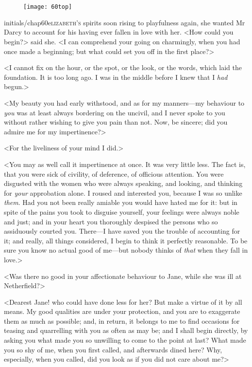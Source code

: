 \chapter[Chapter \thechapter]{}
	
\begin{figure}[t!]
\centering
\texttt{[image: 60top]}
\end{figure}


\lettrine[lines=6,image=true]{initials/chap60e}{lizabeth's} spirits soon rising to playfulness again, she wanted Mr Darcy to account for his having ever fallen in love with her. <How could you begin?> said she. <I can comprehend your going on charmingly, when you had once made a beginning; but what could set you off in the first place?>

\zz
<I cannot fix on the hour, or the spot, or the look, or the words, which laid the foundation. It is too long ago. I was in the middle before I knew that I \textit{had} begun.>

<My beauty you had early withstood, and as for my manners—my behaviour to \textit{you} was at least always bordering on the uncivil, and I never spoke to you without rather wishing to give you pain than not. Now, be sincere; did you admire me for my impertinence?>

<For the liveliness of your mind I did.>

<You may as well call it impertinence at once. It was very little less. The fact is, that you were sick of civility, of deference, of officious attention. You were disgusted with the women who were always speaking, and looking, and thinking for \textit{your} approbation alone. I roused and interested you, because I was so unlike \textit{them}. Had you not been really amiable you would have hated me for it: but in spite of the pains you took to disguise yourself, your feelings were always noble and just; and in your heart you thoroughly despised the persons who so assiduously courted you. There—I have saved you the trouble of accounting for it; and really, all things considered, I begin to think it perfectly reasonable. To be sure you know no actual good of me—but nobody thinks of \textit{that} when they fall in love.>

<Was there no good in your affectionate behaviour to Jane, while she was ill at Netherfield?>

<Dearest Jane! who could have done less for her? But make a virtue of it by all means. My good qualities are under your protection, and you are to exaggerate them as much as possible; and, in return, it belongs to me to find occasions for teasing and quarrelling with you as often as may be; and I shall begin directly, by asking you what made you so unwilling to come to the point at last? What made you so shy of me, when you first called, and afterwards dined here? Why, especially, when you called, did you look as if you did not care about me?>

